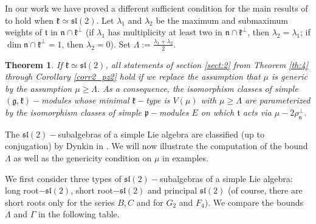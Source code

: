 \documentclass[10pt]{amsart}
\newtheorem{theo}{Theorem}[section]
\renewcommand{\gg}{\mathfrak{g}}
\newcommand{\kk}{\mathfrak{k}}
\newcommand{\nn}{\mathfrak{n}}
\newcommand{\pp}{\mathfrak{p}}
\renewcommand{\tt}{\mathfrak{t}}
\renewcommand{\sl}{\mathfrak{sl}}
\begin{document}
In our work \cite{PZ5} we have proved a different sufficient condition for the main results of \cite{PZ2} to hold when $\kk \simeq \sl(2)$. Let $\lambda_1$ and $\lambda_2$ be the maximum and submaximum weights of $\tt$ in $\nn \cap \kk^{\perp}$ (if $\lambda_1$ has multiplicity at least two in $\nn \cap \kk^{\perp}$, then $\lambda_2 = \lambda_1$; if $\dim \nn \cap \kk^{\perp} = 1$, then $\lambda_2 = 0$). Set $\Lambda := \frac{\lambda_1 + \lambda_2}{2}$.

\begin{theo}\label{th:5}
 If $\kk \simeq \sl(2)$, all statements of section \ref{sect:2} from Theorem \ref{th:4} through Corollary \ref{corr2_pz2} hold if we replace the assumption that $\mu$ is generic by the assumption $\mu \geq \Lambda$. As a consequence, the isomorphism classes of simple $(\gg,\kk)-$modules whose minimal $\kk-$type is $V(\mu)$ with $\mu \geq \Lambda$ are parameterized by the isomorphism classes of simple $\pp-$modules $E$ on which $\tt$ acts via $\mu - 2\rho_{\nn}^{\perp}$. 
\end{theo}

The $\sl(2)-$subalgebras of a simple Lie algebra are classified (up to conjugation) by Dynkin in \cite{D}. We will now illustrate the computation of the bound $\Lambda$ as well as the genericity condition on $\mu$ in examples.

We first consider three types of $\sl(2)-$subalgebras of a simple Lie algebra: long root$-\sl(2)$, short root$-\sl(2)$ and principal $\sl(2)$ (of course, there are short roots only for the series $B, C$ and for $G_2$ and $F_4$). We compare the bounds $\Lambda$ and $\Gamma$ in the following table.
\end{document}
